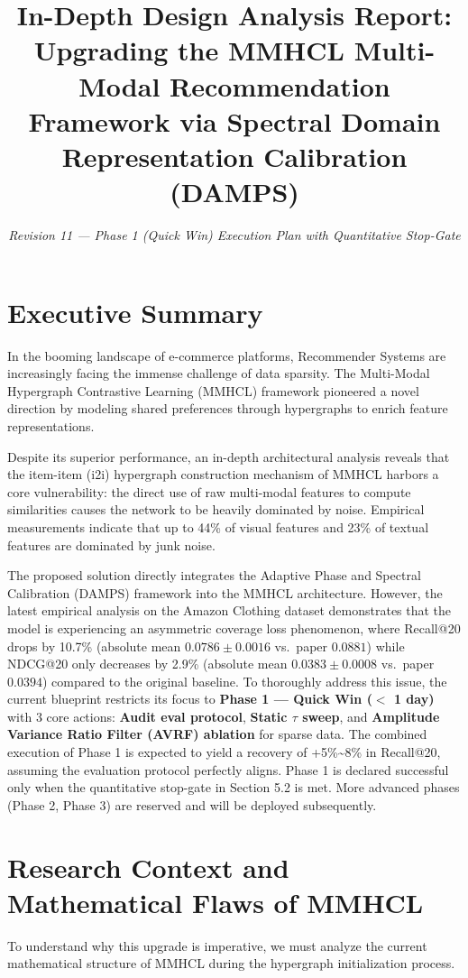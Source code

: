 \documentclass[12pt, a4paper]{article}
\title{\textbf{In-Depth Design Analysis Report:\\Upgrading the MMHCL Multi-Modal Recommendation Framework via Spectral Domain Representation Calibration (DAMPS)}}
\author{\textit{Revision 11 --- Phase 1 (Quick Win) Execution Plan with Quantitative Stop-Gate}}
\date{}
\begin{document}
\maketitle

\section*{Executive Summary}
In the booming landscape of e-commerce platforms, Recommender Systems are increasingly facing the immense challenge of data sparsity. The Multi-Modal Hypergraph Contrastive Learning (MMHCL) framework pioneered a novel direction by modeling shared preferences through hypergraphs to enrich feature representations.

Despite its superior performance, an in-depth architectural analysis reveals that the item-item (i2i) hypergraph construction mechanism of MMHCL harbors a core vulnerability: the direct use of raw multi-modal features to compute similarities causes the network to be heavily dominated by noise. Empirical measurements indicate that up to 44\% of visual features and 23\% of textual features are dominated by junk noise.

The proposed solution directly integrates the Adaptive Phase and Spectral Calibration (DAMPS) framework into the MMHCL architecture. However, the latest empirical analysis on the Amazon Clothing dataset demonstrates that the model is experiencing an asymmetric coverage loss phenomenon, where Recall@20 drops by 10.7\% (absolute mean $0.0786 \pm 0.0016$ vs.\ paper $0.0881$) while NDCG@20 only decreases by 2.9\% (absolute mean $0.0383 \pm 0.0008$ vs.\ paper $0.0394$) compared to the original baseline. To thoroughly address this issue, the current blueprint restricts its focus to \textbf{Phase 1 --- Quick Win ($<$ 1 day)} with 3 core actions: \textbf{Audit eval protocol}, \textbf{Static $\tau$ sweep}, and \textbf{Amplitude Variance Ratio Filter (AVRF) ablation} for sparse data. The combined execution of Phase 1 is expected to yield a recovery of +5\%\textasciitilde8\% in Recall@20, assuming the evaluation protocol perfectly aligns. Phase 1 is declared successful only when the quantitative stop-gate in Section 5.2 is met. More advanced phases (Phase 2, Phase 3) are reserved and will be deployed subsequently.

\section{Research Context and Mathematical Flaws of MMHCL}
To understand why this upgrade is imperative, we must analyze the current mathematical structure of MMHCL during the hypergraph initialization process.
\end{document}
